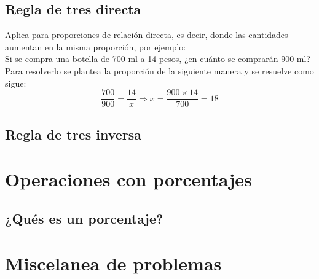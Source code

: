 \subsection{Regla de tres directa}
Aplica para proporciones de relación directa, es decir, donde las cantidades aumentan en la misma proporción, por ejemplo:\\
Si se compra una botella de 700 ml a 14 pesos, ¿en cuánto se comprarán 900 ml?\\
Para resolverlo se plantea la proporción de la siguiente manera y se resuelve como sigue:
\begin{equation*}
\dfrac{700}{900}=\dfrac{14}{x}\Rightarrow x=\dfrac{900\times 14}{700} = 18
\end{equation*}
\subsection{Regla de tres inversa}

\section{Operaciones con porcentajes}

\subsection{¿Qués es un porcentaje?}

\section{Miscelanea de problemas}
